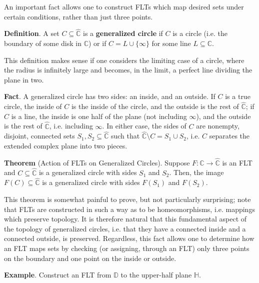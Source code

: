\begin{shaded}
    An important fact allows one to construct FLTs which map desired sets under certain conditions, rather than just three points.

    \textbf{Definition}. A set $C\subseteq\hat{\mathbb{C}}$ is a \textbf{generalized circle} if $C$ is a circle (i.e. the boundary of some disk in $\mathbb{C}$) or if $C=L\cup \{\infty\}$ for some line $L\subseteq\mathbb{C}$.

    This definition makes sense if one considers the limiting case of a circle, where the radius is infinitely large and becomes, in the limit, a perfect line dividing the plane in two.

    \textbf{Fact}. A generalized circle has two sides: an inside, and an outside. If $C$ is a true circle, the inside of $C$ is the inside of the circle, and the outside is the rest of $\hat{\mathbb{C}}$; if $C$ is a line, the inside is one half of the plane (not including $\infty$), and the outside is the rest of $\hat{\mathbb{C}}$, i.e. including $\infty$. In either case, the sides of $C$ are nonempty, disjoint, connected sets $S_1,S_2\subseteq\hat{\mathbb{C}}$ such that $\hat{\mathbb{C}}\setminus C = S_1\cup S_2$, i.e. $C$ separates the extended complex plane into two pieces.

    \textbf{Theorem} (Action of FLTs on Generalized Circles). Suppose $F:\hat{\mathbb{C}} \to \hat{\mathbb{C}}$ is an FLT and $C\subseteq\hat{\mathbb{C}}$ is a generalized circle with sides $S_1$ and $S_2$. Then, the image $F(C)\subseteq\hat{\mathbb{C}}$ is a generalized circle with sides $F(S_1)$ and $F(S_2)$.

    This theorem is somewhat painful to prove, but not particularly surprising; note that FLTs are constructed in such a way as to be homeomorphisms, i.e. mappings which preserve topology. It is therefore natural that this fundamental aspect of the topology of generalized circles, i.e. that they have a connected inside and a connected outside, is preserved. Regardless, this fact allows one to determine how an FLT maps sets by checking (or assigning, through an FLT) only three points on the boundary and one point on the inside or outside.
\end{shaded}

\textbf{Example}. Construct an FLT from $\mathbb{D}$ to the upper-half plane $\mathbb{H}$.

